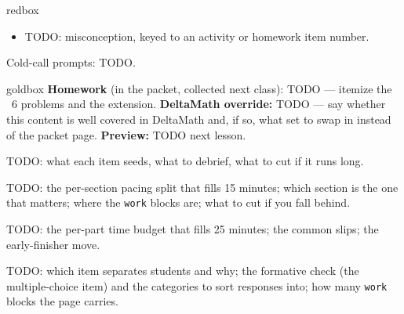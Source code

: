 \documentclass[10pt]{article}
\begin{document}
\boxguard
\begin{skillbox}{redbox}
\begin{itemize}[leftmargin=1.2em, nosep]
  \item TODO: misconception, keyed to an activity or homework item number.
\end{itemize}
Cold-call prompts: TODO.
\end{skillbox}

\boxguard
\begin{skillbox}{goldbox}
\textbf{Homework} (in the packet, collected next class): TODO --- itemize the ~6 problems and the
extension. \textbf{DeltaMath override:} TODO --- say whether this content is well covered in
DeltaMath and, if so, what set to swap in instead of the packet page. \textbf{Preview:}
TODO next lesson.
\end{skillbox}

\begin{teachernote}[Warm-Up]
TODO: what each item seeds, what to debrief, what to cut if it runs long.
\end{teachernote}

\begin{teachernote}
TODO: the per-section pacing split that fills 15 minutes; which section is the one that matters;
where the \texttt{work} blocks are; what to cut if you fall behind.
\end{teachernote}

\begin{teachernote}
TODO: the per-part time budget that fills 25 minutes; the common slips; the early-finisher move.
\end{teachernote}

\begin{teachernote}[Homework]
TODO: which item separates students and why; the formative check (the multiple-choice item) and
the categories to sort responses into; how many \texttt{work} blocks the page carries.
\end{teachernote}
\end{document}
